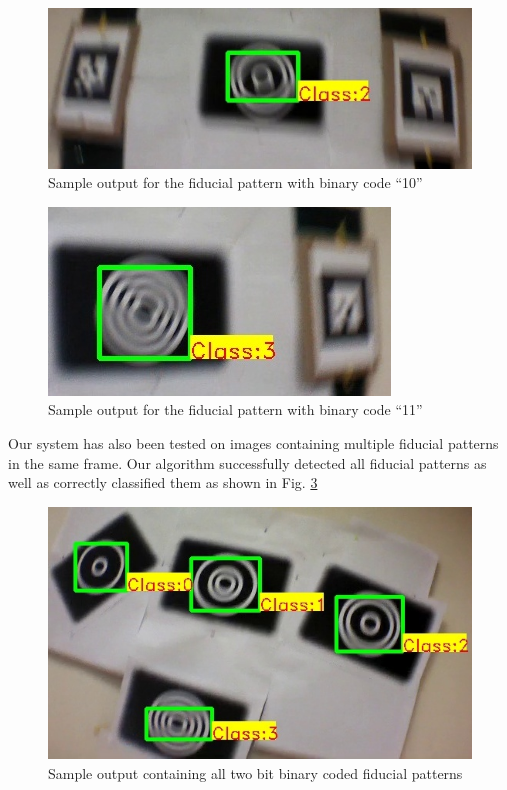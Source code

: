 \documentclass[runningheads]{llncs}
\begin{document}
\begin{figure}
\centering
  \includegraphics[width=.8\linewidth]{output_10.jpg}
  \caption{Sample output for the fiducial pattern with binary code ``10''}
  \label{fig:output2}
\end{figure}

\begin{figure}
\centering
  \includegraphics[width=.8\linewidth]{output_11.jpg}
  \caption{Sample output for the fiducial pattern with binary code ``11''}
  \label{fig:output3}
\end{figure}

Our system has also been tested on images containing multiple fiducial patterns
in the same frame. Our algorithm successfully detected all fiducial patterns as
well as correctly classified them as shown in Fig. \ref{fig:output_all}
\begin{figure}
\centering
  \includegraphics[width=.8\linewidth]{output_all_2.jpg}
  \caption{Sample output containing all two bit binary coded fiducial patterns}
  \label{fig:output_all}
\end{figure}
\end{document}
